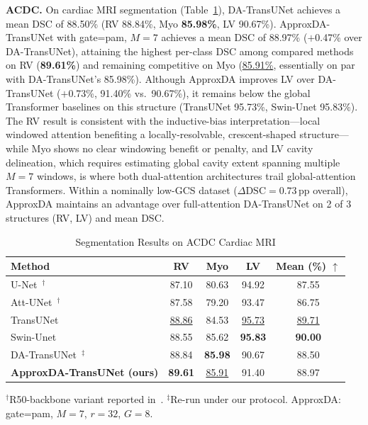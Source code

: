 \textbf{ACDC.} On cardiac MRI segmentation (Table~\ref{tab:acdc}), DA-TransUNet achieves a mean DSC of 88.50\% (RV 88.84\%, Myo \textbf{85.98\%}, LV 90.67\%). ApproxDA-TransUNet with gate=pam, $M{=}7$ achieves a mean DSC of 88.97\% ($+$0.47\% over DA-TransUNet), attaining the highest per-class DSC among compared methods on RV (\textbf{89.61\%}) and remaining competitive on Myo (\underline{85.91\%}, essentially on par with DA-TransUNet's 85.98\%). Although ApproxDA improves LV over DA-TransUNet ($+$0.73\%, 91.40\% vs.\ 90.67\%), it remains below the global Transformer baselines on this structure (TransUNet 95.73\%, Swin-Unet 95.83\%). The RV result is consistent with the inductive-bias interpretation---local windowed attention benefiting a locally-resolvable, crescent-shaped structure---while Myo shows no clear windowing benefit or penalty, and LV cavity delineation, which requires estimating global cavity extent spanning multiple $M{=}7$ windows, is where both dual-attention architectures trail global-attention Transformers. Within a nominally low-GCS dataset ($\Delta\text{DSC}{=}0.73$\,pp overall), ApproxDA maintains an advantage over full-attention DA-TransUNet on 2 of 3 structures (RV, LV) and mean DSC.

\begin{table}[ht]
  \caption{Segmentation Results on ACDC Cardiac MRI}
  \label{tab:acdc}
  \centering
  \renewcommand{\arraystretch}{1.15}
  \setlength{\tabcolsep}{3pt}
  \small
  \begin{tabular}{lcccc}
    \toprule
    Method & RV & Myo & LV & Mean (\%) $\uparrow$ \\
    \midrule
    U-Net~\cite{ronneberger2015unet}$^\dag$          & 87.10 & 80.63 & 94.92 & 87.55 \\
    Att-UNet~\cite{oktay2018attention}$^\dag$         & 87.58 & 79.20 & 93.47 & 86.75 \\
    TransUNet~\cite{chen2021transunet}                & \underline{88.86} & 84.53 & \underline{95.73} & \underline{89.71} \\
    Swin-Unet~\cite{cao2022swinunet}                  & 88.55 & 85.62 & \textbf{95.83} & \textbf{90.00} \\
    DA-TransUNet~\cite{sun2024datransunet}$^\ddag$    & 88.84 & \textbf{85.98} & 90.67 & 88.50 \\
    \midrule
    \textbf{ApproxDA-TransUNet (ours)} & \textbf{89.61} & \underline{85.91} & 91.40 & 88.97 \\
    \bottomrule
  \end{tabular}
  \par\vspace{5pt}
  \parbox{\columnwidth}{\footnotesize $^\dag$R50-backbone variant reported in~\cite{chen2021transunet}. $^\ddag$Re-run under our protocol. ApproxDA: gate=pam, $M{=}7$, $r{=}32$, $G{=}8$.}
\end{table}

